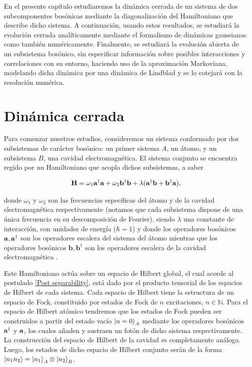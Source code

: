 \documentclass{report} %
\numberwithin{equation}{section}
\begin{document}
En el presente capítulo estudiaremos la dinámica cerrada de un sistema de dos subcomponentes bosónicas mediante la diagonalización del Hamiltoniano que describe dicho sistema. A continuación, usando estos resultados, se estudiará la evolución cerrada analíticamente mediante el formalismo de dinámicas gaussianas como también numéricamente. Finalmente, se estudiará la evolución abierta de un subsistema bosónico, sin especificar información sobre posibles interacciones y correlaciones con su entorno, haciendo uso de la aproximación Markoviana, modelando dicha dinámica por una dinámica de Lindblad y se lo cotejará con la resolución numérica.


\section{Din\'amica cerrada}

Para comenzar nuestros estudios, consideremos un sistema conformado por dos subsistemas de carácter bosónico: un primer sistema $A$, un átomo, y un subsistema $B$, una cavidad electromagnética. El sistema conjunto se encuentra regido por un Hamiltoniano que acopla dichos subsistemas, a saber

\begin{equation}
    \mathbf{H} = \omega_1 {\bf a}^{\dagger}{\bf a} + \omega_2 {\mathbf b}^{\dagger}{\mathbf b} + \lambda({\bf a}^{\dagger}{\mathbf b}+ {\mathbf b}^{\dagger}{\bf a}),
    \label{model3.1_hamiltonian}
\end{equation}

donde $\omega_1$ y $\omega_2$ son las frecuencias específicas del átomo y de la cavidad electromagnética respectivamente (notamos que cada subsistema dispone de una única frecuencia en su descomposición de Fourier), siendo $\lambda$ una constante de interacción, con unidades de energía ($\hbar = 1$) y donde los operadores bosónicos ${\bf a},{\bf a}^{\dagger}$ son los operadores escalera del sistema del átomo mientras que los operadores bosónicos ${\mathbf b},{\mathbf b}^{\dagger}$ son los operadores escalera de la cavidad electromagnética \cite{CohenTannoudji1989}.  

Este Hamiltoniano actúa sobre un espacio de Hilbert global, el cual acorde al postulado \ref{Post separability}, está dado por el producto tensorial de los espacios de Hilbert de cada sistema. Cada espacio de Hilbert tiene la estructura de un espacio de Fock, constituido por estados de Fock de $n$ excitaciones, $n \in \mathds{N}$. Para el espacio de Hilbert atómico tendremos que los estados de Fock pueden ser construidos a partir del estado vacío $\ket{n=0}_A$ mediante los operadores bosónicos ${\bf a}^{\dagger}$ y ${\bf a}$, los cuales añaden y sustraen un fotón de dicho sistema respectivamente. La construcción del espacio de Hilbert de la cavidad es completamente análoga. Luego, los estados de dicho espacio de Hilbert conjunto serán de la forma $\ket{n_1 n_2} = \ket{n_1}_A \otimes \ket{n_2}_B$.
\end{document}
